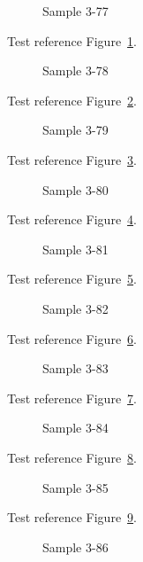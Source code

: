 \begin{figure}[tbhp]
\caption{Sample 3-77}
\label{fig:sample-3-77}
\end{figure}

Test reference Figure~\ref{fig:sample-3-77}.

\begin{figure}[tbhp]
\caption{Sample 3-78}
\label{fig:sample-3-78}
\end{figure}

Test reference Figure~\ref{fig:sample-3-78}.

\begin{figure}[tbhp]
\caption{Sample 3-79}
\label{fig:sample-3-79}
\end{figure}

Test reference Figure~\ref{fig:sample-3-79}.

\begin{figure}[tbhp]
\caption{Sample 3-80}
\label{fig:sample-3-80}
\end{figure}

Test reference Figure~\ref{fig:sample-3-80}.

\begin{figure}[tbhp]
\caption{Sample 3-81}
\label{fig:sample-3-81}
\end{figure}

Test reference Figure~\ref{fig:sample-3-81}.

\begin{figure}[tbhp]
\caption{Sample 3-82}
\label{fig:sample-3-82}
\end{figure}

Test reference Figure~\ref{fig:sample-3-82}.

\begin{figure}[tbhp]
\caption{Sample 3-83}
\label{fig:sample-3-83}
\end{figure}

Test reference Figure~\ref{fig:sample-3-83}.

\begin{figure}[tbhp]
\caption{Sample 3-84}
\label{fig:sample-3-84}
\end{figure}

Test reference Figure~\ref{fig:sample-3-84}.

\begin{figure}[tbhp]
\caption{Sample 3-85}
\label{fig:sample-3-85}
\end{figure}

Test reference Figure~\ref{fig:sample-3-85}.

\begin{figure}[tbhp]
\caption{Sample 3-86}
\label{fig:sample-3-86}
\end{figure}

